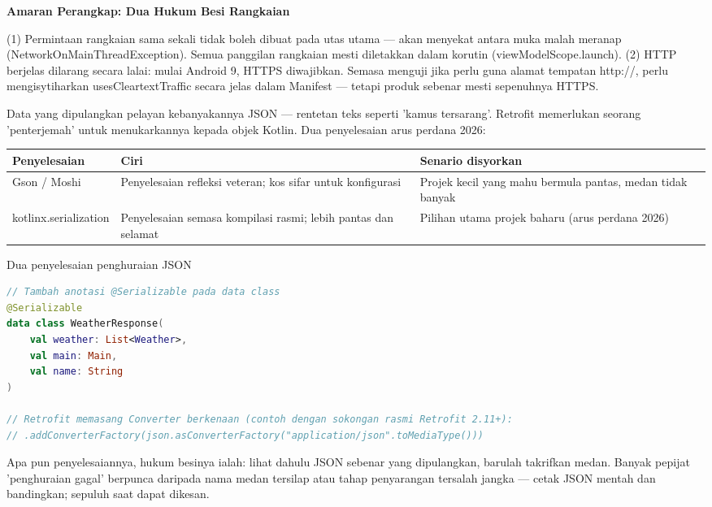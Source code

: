 \textbf{Amaran Perangkap: Dua Hukum Besi Rangkaian}\par

(1) Permintaan rangkaian sama sekali tidak boleh dibuat pada utas utama — akan menyekat antara muka malah meranap (NetworkOnMainThreadException). Semua panggilan rangkaian mesti diletakkan dalam korutin (viewModelScope.launch). (2) HTTP berjelas dilarang secara lalai: mulai Android 9, HTTPS diwajibkan. Semasa menguji jika perlu guna alamat tempatan http://, perlu mengisytiharkan usesCleartextTraffic secara jelas dalam Manifest — tetapi produk sebenar mesti sepenuhnya HTTPS.


Data yang dipulangkan pelayan kebanyakannya JSON — rentetan teks seperti 'kamus tersarang'. Retrofit memerlukan seorang 'penterjemah' untuk menukarkannya kepada objek Kotlin. Dua penyelesaian arus perdana 2026:

\begin{center}
\begin{tabularx}{\linewidth}{|X|X|X|}
\hline
\textbf{Penyelesaian} & \textbf{Ciri} & \textbf{Senario disyorkan} \tabularnewline
\hline
Gson / Moshi & Penyelesaian refleksi veteran; kos sifar untuk konfigurasi & Projek kecil yang mahu bermula pantas, medan tidak banyak \tabularnewline
kotlinx.serialization & Penyelesaian semasa kompilasi rasmi; lebih pantas dan selamat & Pilihan utama projek baharu (arus perdana 2026) \tabularnewline
\hline
\end{tabularx}
\end{center}

\begin{center}\small\color{gray}Dua penyelesaian penghuraian JSON\end{center}

\begin{lstlisting}[language=Kotlin]
// Tambah anotasi @Serializable pada data class
@Serializable
data class WeatherResponse(
    val weather: List<Weather>,
    val main: Main,
    val name: String
)

// Retrofit memasang Converter berkenaan (contoh dengan sokongan rasmi Retrofit 2.11+):
// .addConverterFactory(json.asConverterFactory("application/json".toMediaType()))
\end{lstlisting}

Apa pun penyelesaiannya, hukum besinya ialah: lihat dahulu JSON sebenar yang dipulangkan, barulah takrifkan medan. Banyak pepijat 'penghuraian gagal' berpunca daripada nama medan tersilap atau tahap penyarangan tersalah jangka — cetak JSON mentah dan bandingkan; sepuluh saat dapat dikesan.

